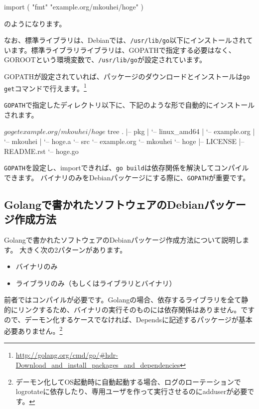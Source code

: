 \documentclass[mingoth,a4paper]{jsarticle}
\begin{document}
\begin{commandline}
import (
    "fmt"
    "example.org/mkouhei/hoge"
)
\end{commandline}

のようになります。

なお、標準ライブラリは、Debianでは、\texttt{/usr/lib/go}以下にインストールされています。標準ライブラリライブラリは、GOPATHで指定する必要はなく、GOROOTという環境変数で、\texttt{/usr/lib/go}が設定されています。

GOPATHが設定されていれば、パッケージのダウンロードとインストールは\texttt{go get}コマンドで行えます。\footnote{\url{http://golang.org/cmd/go/\#hdr-Download_and_install_packages_and_dependencies}}

\texttt{GOPATH}で指定したディレクトリ以下に、下記のような形で自動的にインストールされます。

\begin{commandline}
$ go get example.org/mkouhei/hoge
$ tree
.
|-- pkg
|   `-- linux_amd64
|       `-- example.org
|           `-- mkouhei
|               `-- hoge.a
`-- src
    `-- example.org
        `-- mkouhei
            `-- hoge
                |-- LICENSE
                |-- README.rst
                `-- hoge.go
\end{commandline}

\texttt{GOPATH}を設定し、importできれば、\texttt{go build}は依存関係を解決してコンパイルできます。
バイナリのみをDebianパッケージにする際に、\texttt{GOPATH}が重要です。

\subsection{Golangで書かれたソフトウェアのDebianパッケージ作成方法}

Golangで書かれたソフトウェアのDebianパッケージ作成方法について説明します。
大きく次の2パターンがあります。

\begin{itemize}
\item バイナリのみ
\item ライブラリのみ（もしくはライブラリとバイナリ）
\end{itemize}

前者ではコンパイルが必要です。Golangの場合、依存するライブラリを全て静的にリンクするため、バイナリの実行そのものには依存関係はありません。ですので、デーモン化するケースでなければ、Dependsに記述するパッケージが基本必要ありません。\footnote{デーモン化してOS起動時に自動起動する場合、ログのローテーションでlogrotateに依存したり、専用ユーザを作って実行させるのにadduserが必要です。}
\end{document}
